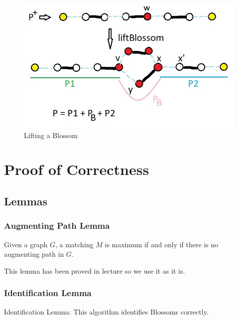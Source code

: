 \documentclass{article}
\begin{document}
\begin{figure}[!h]
    \centering
    \includegraphics[scale=0.58]{lifting.jpg}
    \caption{Lifting a Blossom}
\end{figure}


\section{Proof of Correctness}
\subsection{Lemmas}
\subsubsection{Augmenting Path Lemma}
Given a graph $G$, a matching $M$ is maximum if and only if there is no augmenting path in $G$.

This lemma has been proved in lecture so we use it as it is.

\subsubsection{Identification Lemma}
Identification Lemma: This algorithm identifies Blossoms correctly.
\end{document}
